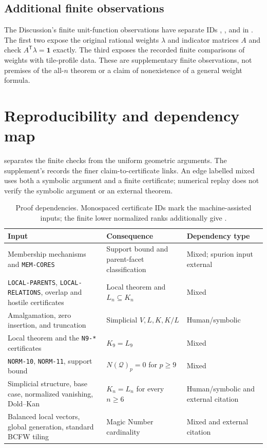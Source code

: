 \documentclass[11pt]{article}
\newcommand{\Qcal}{\mathcal Q}
\newcommand{\1}{\mathbf 1}
\begin{document}
\subsection{Additional finite observations}
\label{cert:N8-UNIT}\label{cert:N9-UNIT}\label{cert:WEIGHT-PROBES}

The Discussion's finite unit-function observations have separate IDs
, , and  in
.  The first two expose the original rational
weights $\lambda$ and indicator matrices $A$ and check
$A^{\mathsf T}\lambda=\mathbf1$ exactly.  The third exposes the recorded
finite comparisons of weights with tile-profile data.  These are
supplementary finite observations, not premises of the all-$n$ theorem
or a claim of nonexistence of a general weight formula.

\section{Reproducibility and dependency map}\label{app:repro}

 separates the finite checks from the uniform
geometric arguments.  The supplement's 
records the finer claim-to-certificate links.  An edge labelled mixed
uses both a symbolic argument and a finite certificate; numerical replay
does not verify the symbolic argument or an external theorem.

\begin{table}[ht]
\centering\small
\begin{tabular}{p{}p{}p{}}
\toprule
Input & Consequence & Dependency type\\
\midrule
Membership mechanisms and \texttt{MEM-CORES}
 & Support bound and parent-facet classification & Mixed; spurion input external\\
\texttt{LOCAL-PARENTS}, \texttt{LOCAL-RELATIONS}, overlap and hostile certificates
 & Local theorem and $L_n\subseteq K_n$ & Mixed\\
Amalgamation, zero insertion, and truncation
 & Simplicial $V,L,K,K/L$ & Human/symbolic\\
Local theorem and the \texttt{N9-*} certificates
 & $K_9=L_9$ & Mixed\\
\texttt{NORM-10}, \texttt{NORM-11}, support bound
 & $N(\Qcal)_p=0$ for $p\ge9$ & Mixed\\
Simplicial structure, base case, normalized vanishing, Dold--Kan
 & $K_n=L_n$ for every $n\ge6$ & Human/symbolic and external citation\\
Balanced local vectors, global generation, standard BCFW tiling
 & Magic Number cardinality & Mixed and external citation\\
\bottomrule
\end{tabular}
\caption{Proof dependencies.  Monospaced certificate IDs mark the
machine-assisted inputs; the finite lower normalized ranks additionally
give .}
\label{tab:dependencies}
\end{table}
\end{document}
